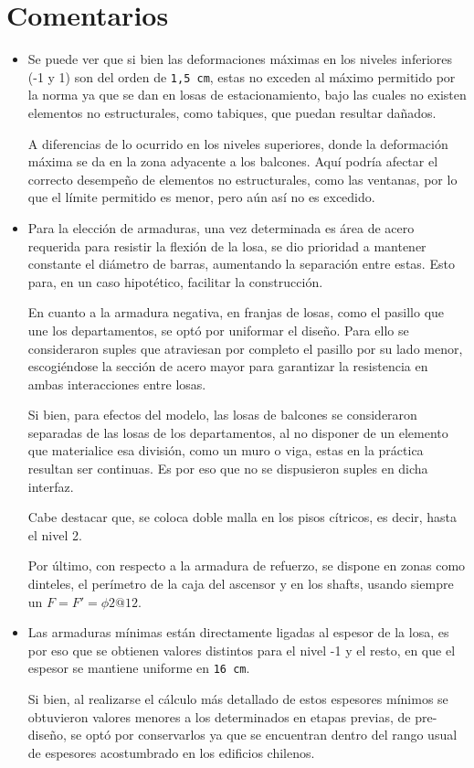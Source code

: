 \newpage

\section{Comentarios}

\begin{itemize}
    \item Se puede ver que si bien las deformaciones máximas en los niveles inferiores (-1 y 1) son del orden de \texttt{1,5 cm}, estas no exceden al máximo permitido por la norma ya que se dan en losas de estacionamiento, bajo las cuales no existen elementos no estructurales, como tabiques, que puedan resultar dañados. 
    
    A diferencias de lo ocurrido en los niveles superiores, donde la deformación máxima se da en la zona adyacente a los balcones. Aquí podría afectar el correcto desempeño de elementos no estructurales, como las ventanas, por lo que el límite permitido es menor, pero aún así no es excedido.
    
    \item Para la elección de armaduras, una vez determinada es área de acero requerida para resistir la flexión de la losa, se dio prioridad a mantener constante el diámetro de barras, aumentando la separación entre estas. Esto para, en un caso hipotético, facilitar la construcción.
    
    En cuanto a la armadura negativa, en franjas de losas, como el pasillo que une los departamentos, se optó por uniformar el diseño. Para ello se consideraron suples que atraviesan por completo el pasillo por su lado menor, escogiéndose la sección de acero mayor para garantizar la resistencia en ambas interacciones entre losas.
    
    Si bien, para efectos del modelo, las losas de balcones se consideraron separadas de las losas de los departamentos, al no disponer de un elemento que materialice esa división, como un muro o viga, estas en la práctica resultan ser continuas. Es por eso que no se dispusieron suples en dicha interfaz.
    
    Cabe destacar que, se coloca doble malla en los pisos cítricos, es decir, hasta el nivel 2. 
    
    Por último, con respecto a la armadura de refuerzo, se dispone en zonas como dinteles, el perímetro de la caja del ascensor y en los shafts, usando siempre un $F=F'= \phi 2 @ 12$.
    
    \item Las armaduras mínimas están directamente ligadas al espesor de la losa, es por eso que se obtienen valores distintos para el nivel -1 y el resto, en que el espesor se mantiene uniforme en \texttt{16 cm}.
    
    Si bien, al realizarse el cálculo más detallado de estos espesores mínimos se obtuvieron valores menores a los determinados en etapas previas, de pre-diseño, se optó por conservarlos ya que se encuentran dentro del rango usual de espesores acostumbrado en los edificios chilenos.
\end{itemize} 
